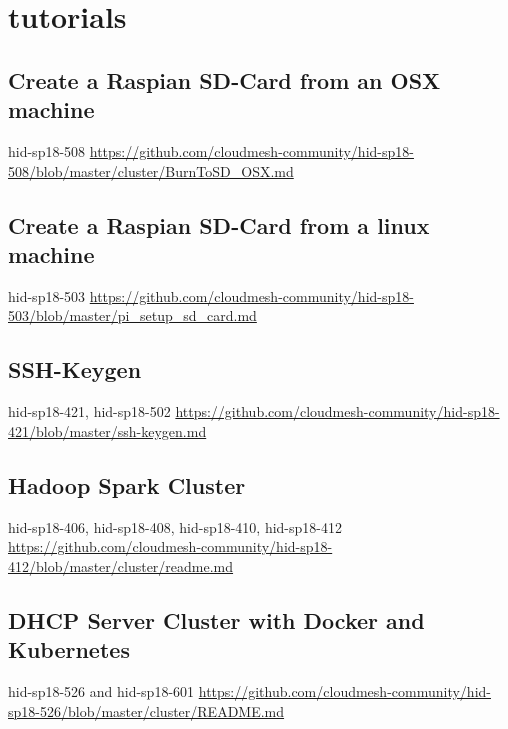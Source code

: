 \chapter{tutorials}

\section{Create a Raspian SD-Card from an OSX machine}
hid-sp18-508
\url{https://github.com/cloudmesh-community/hid-sp18-508/blob/master/cluster/BurnToSD_OSX.md}


\section{Create a Raspian SD-Card from a linux machine}
hid-sp18-503 
\url{https://github.com/cloudmesh-community/hid-sp18-503/blob/master/pi_setup_sd_card.md}

\section{SSH-Keygen}
hid-sp18-421, hid-sp18-502
\url{https://github.com/cloudmesh-community/hid-sp18-421/blob/master/ssh-keygen.md}


\section{Hadoop Spark Cluster }
hid-sp18-406,  hid-sp18-408, hid-sp18-410, hid-sp18-412
\url{https://github.com/cloudmesh-community/hid-sp18-412/blob/master/cluster/readme.md}

 

\section{DHCP Server Cluster with Docker and Kubernetes }
hid-sp18-526 and hid-sp18-601
\url{https://github.com/cloudmesh-community/hid-sp18-526/blob/master/cluster/README.md}


